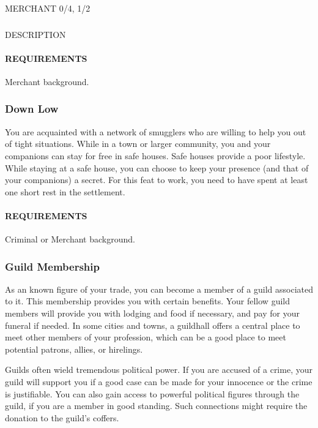 MERCHANT 0/4, 1/2
    \subsubsection{} \label{feat::NAME}
    DESCRIPTION
    \paragraph{REQUIREMENTS} Merchant background.

    \subsubsection{Down Low} \label{feat::downlow}
    You are acquainted with a network of smugglers who are willing to help you out of tight situations.
    While in a town or larger community, you and your companions can stay for free in safe houses.
    Safe houses provide a poor lifestyle.
    While staying at a safe house, you can choose to keep your presence (and that of your companions) a secret.
    For this feat to work, you need to have spent at least one short rest in the settlement.
    \paragraph{REQUIREMENTS} Criminal or Merchant background.

    \subsubsection{Guild Membership} \label{feat::guildmembership}
    As an known figure of your trade, you can become a member of a guild associated to it.
    This membership provides you with certain benefits.
    Your fellow guild members will provide you with lodging and food if necessary, and pay for your funeral if needed.
    In some cities and towns, a guildhall offers a central place to meet other members of your profession, which can be a good place to meet potential patrons, allies, or hirelings.

    Guilds often wield tremendous political power.
    If you are accused of a crime, your guild will support you if a good case can be made for your innocence or the crime is justifiable.
    You can also gain access to powerful political figures through the guild, if you are a member in good standing.
    Such connections might require the donation to the guild's coffers.

